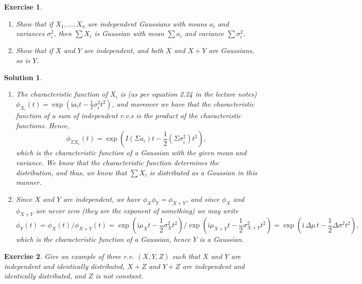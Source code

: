 \documentclass{article}
\newtheorem{ex}{Exercise}
\theoremstyle{nonumberplain}
\newtheorem{sol}{Solution}
\newcommand{\I}{\mathrm{i}}
\begin{document}
\begin{ex}
\leavevmode
\begin{enumerate}
\item Show that if $X_1, \dots, X_n$ are independent Gaussians with means $a_i$ and variances $\sigma_i^2$, then $\sum X_i$ is Gaussian with mean $\sum a_i$ and variance $\sum \sigma_i^2$.

\item Show that if $X$ and $Y$ are independent, and both $X$ and $X+Y$ are Gaussians, so is $Y$.
\end{enumerate}
\end{ex}

\begin{sol}
\leavevmode
\begin{enumerate}
\item The characteristic function of $X_i$ is (as per equation 2.24 in the lecture notes) $\phi_{X_i}(t) = \exp(\I a_i t - \frac12 \sigma_i^2 t^2)$, and moreover we have that the characteristic function of a sum of independent r.v.s is the product of the characteristic functions. Hence,
\begin{equation}
\phi_{\Sigma X_i}(t) = \exp(I (\Sigma a_i) t - \frac12 (\Sigma \sigma_i^2) t^2),
\end{equation}
which is the characteristic function of a Gaussian with the given mean and variance. We know that the characteristic function determines the distribution, and thus, we know that $\sum X_i$ is distributed as a Gaussian in this manner.

\item Since $X$ and $Y$ are independent, we have $\phi_X \phi_Y = \phi_{X+Y}$, and since $\phi_X$ and $\phi_{X+Y}$ are never zero (they are the exponent of something) we may write
\begin{equation}
\phi_Y(t) = \phi_X(t) / \phi_{X+Y}(t) = \exp(\I \mu_X t - \frac12 \sigma_X^2 t^2) / \exp(\I \mu_{X+Y} t - \frac12 \sigma_{X+Y}^2 t^2) = \exp(\I \, \Delta\mu \, t - \frac12 \Delta \sigma^2 t^2),
\end{equation}
which is the characteristic function of a Gaussian, hence $Y$ is a Gaussian.
\end{enumerate}
\end{sol}

\begin{ex}
Give an example of three r.v. $(X,Y,Z)$ such that $X$ and $Y$ are independent and identically distributed, $X+Z$ and $Y+Z$ are independent and identically distributed, and $Z$ is not constant.
\end{ex}
\end{document}
